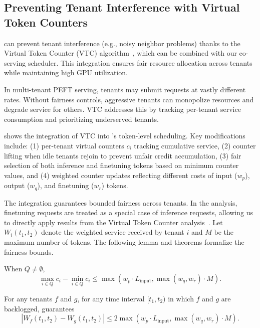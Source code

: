 \subsection{Preventing Tenant Interference with Virtual Token Counters}
\label{flexllm:sec:vtc-integration}

\FlexLLM can prevent tenant interference (e.g., noisy neighbor problems) thanks to the Virtual Token Counter (VTC) algorithm~\cite{sheng2024fairness}, which can be combined with our co-serving scheduler. This integration ensures fair resource allocation across tenants while maintaining high GPU utilization.

In multi-tenant PEFT serving, tenants may submit requests at vastly different rates. Without fairness controls, aggressive tenants can monopolize resources and degrade service for others. VTC addresses this by tracking per-tenant service consumption and prioritizing underserved tenants.

 shows the integration of VTC into \FlexLLM's token-level scheduling. Key modifications include: (1) per-tenant virtual counters $c_i$ tracking cumulative service, (2) counter lifting when idle tenants rejoin to prevent unfair credit accumulation, (3) fair selection of both inference and finetuning tokens based on minimum counter values, and (4) weighted counter updates reflecting different costs of input ($w_p$), output ($w_q$), and finetuning ($w_r$) tokens.

The integration guarantees bounded fairness across tenants. In the analysis, finetuning requests are treated as a special case of inference requests, allowing us to directly apply results from the Virtual Token Counter analysis~\cite{sheng2024fairness}. Let $W_i(t_1, t_2)$ denote the weighted service received by tenant $i$ and $M$ be the maximum number of tokens. The following lemma and theorems formalize the fairness bounds.

\begin{lemma}
When $Q \neq \emptyset$,
\begin{equation}\label{flexllm:eq:vtc}
    \max_{i \in Q} c_i - \min_{i \in Q} c_i \le \max(w_p \cdot L_{\text{input}}, \max(w_q, w_r) \cdot M).
\end{equation}
\end{lemma}

\begin{theorem}
    For any tenants $f$ and $g$, for any time interval $[t_1,t_2)$ in which $f$ and $g$ are backlogged,  guarantees
\[
    |W_f(t_1, t_2) - W_g(t_1, t_2)| \leq 2\max(w_p \cdot L_{\text{input}}, \max(w_q, w_r) \cdot M).
\]
\end{theorem}

